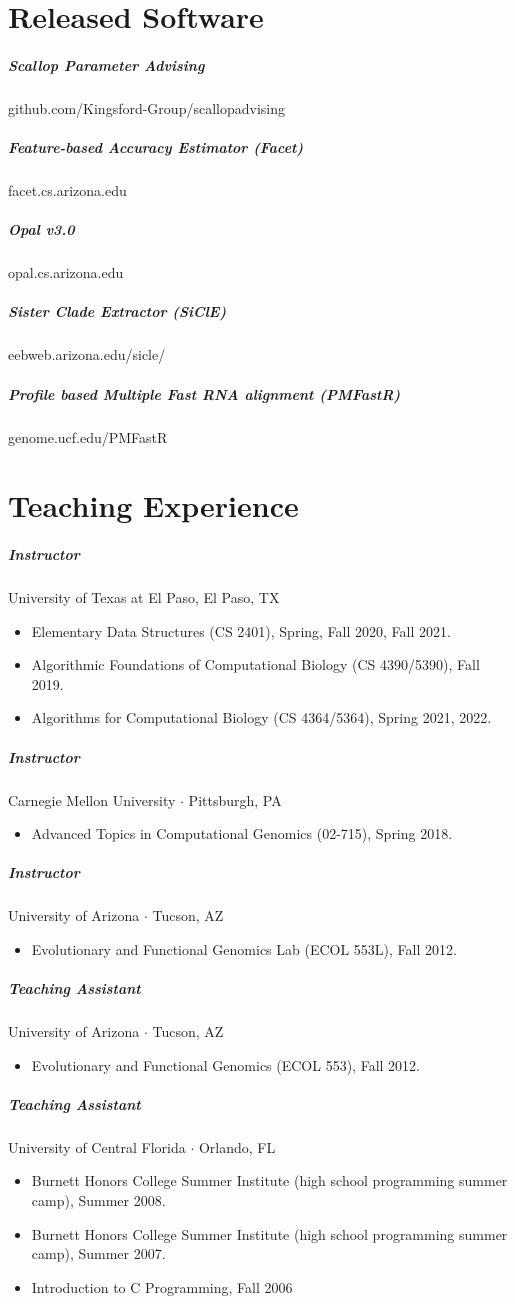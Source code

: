 \documentclass[10pt,letterpaper]{article}
\newcommand{\bigdot}{$\cdot$\xspace}
\begin{document}
\section*{Released Software}
\subparagraph{Scallop Parameter Advising}						github.com/Kingsford-Group/scallopadvising
\subparagraph{Feature-based Accuracy Estimator (Facet)} 			facet.cs.arizona.edu
\subparagraph{Opal v3.0}										opal.cs.arizona.edu 
\subparagraph{Sister Clade Extractor (SiClE)}						eebweb.arizona.edu/sicle/
\subparagraph{Profile based Multiple Fast RNA alignment (PMFastR)}	genome.ucf.edu/PMFastR 

\section*{Teaching Experience}

\subparagraph{Instructor}  University of Texas at El Paso, El Paso, TX
\begin{itemize}
	\item Elementary Data Structures (CS 2401), Spring, Fall 2020, Fall 2021.
	\item Algorithmic Foundations of Computational Biology (CS 4390/5390), Fall 2019.
	\item Algorithms for Computational Biology (CS 4364/5364), Spring 2021, 2022.
\end{itemize}

\subparagraph{Instructor}  Carnegie Mellon University \bigdot Pittsburgh, PA
\begin{itemize}
    \item Advanced Topics in Computational Genomics (02-715), Spring 2018.
\end{itemize}

\subparagraph{Instructor} University of Arizona \bigdot Tucson, AZ
\begin{itemize}
    \item Evolutionary and Functional Genomics Lab (ECOL 553L), Fall 2012.
\end{itemize}

\subparagraph{Teaching Assistant}
University of Arizona \bigdot Tucson, AZ
\begin{itemize}
    \item Evolutionary and Functional Genomics (ECOL 553), Fall 2012.
\end{itemize}

\subparagraph{Teaching Assistant}
University of Central Florida \bigdot Orlando, FL
\begin{itemize}
    \item Burnett Honors College Summer Institute (high school programming summer camp), Summer 2008.
    \item Burnett Honors College Summer Institute (high school programming summer camp), Summer 2007.
    \item Introduction to C Programming, Fall 2006
\end{itemize}
\end{document}

